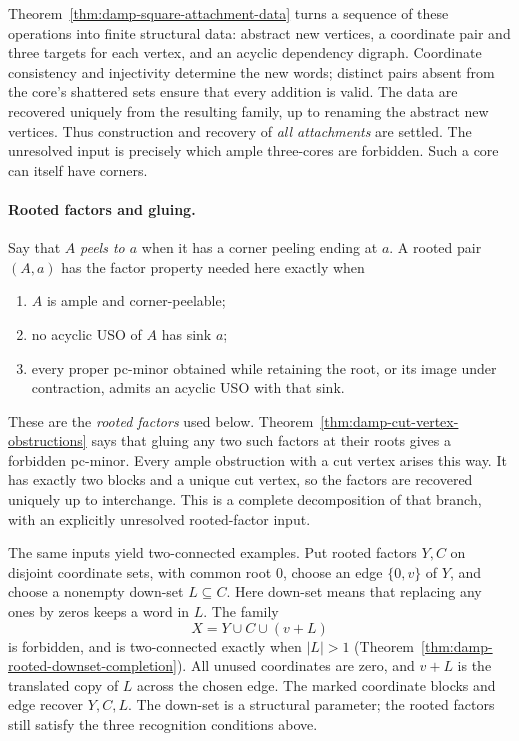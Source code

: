 \documentclass[11pt]{article}
\numberwithin{equation}{section}
\theoremstyle{definition}
\theoremstyle{remark}
\begin{document}
Theorem~\ref{thm:damp-square-attachment-data} turns a sequence of
these operations into finite structural data: abstract new vertices,
a coordinate pair and three targets for each vertex, and an acyclic
dependency digraph.  Coordinate consistency and injectivity determine
the new words; distinct pairs absent from the core's shattered sets
ensure that every addition is valid.  The data are recovered uniquely
from the resulting family, up to renaming the abstract new vertices.
Thus construction and recovery of \emph{all attachments} are settled.
The unresolved input is precisely which ample three-cores are forbidden.
Such a core can itself have corners.

\paragraph{Rooted factors and gluing.}
Say that \(A\) \emph{peels to \(a\)} when it has a corner peeling
ending at \(a\).  A rooted pair \((A,a)\) has the factor property
needed here exactly when
\begin{enumerate}
 \item \(A\) is ample and corner-peelable;
 \item no acyclic USO of \(A\) has sink \(a\);
 \item every proper pc-minor obtained while retaining the root, or
       its image under contraction, admits an acyclic USO with that sink.
\end{enumerate}
These are the \emph{rooted factors} used below.
Theorem~\ref{thm:damp-cut-vertex-obstructions} says that gluing any
two such factors at their roots gives a forbidden pc-minor.  Every
ample obstruction with a cut vertex arises this way.  It has exactly
two blocks and a unique cut vertex, so the factors are recovered
uniquely up to interchange.  This is a complete decomposition of that
branch, with an explicitly unresolved rooted-factor input.

The same inputs yield two-connected examples.  Put rooted factors
\(Y,C\) on disjoint coordinate sets, with common root \(0\), choose
an edge \(\{0,v\}\) of \(Y\), and choose a nonempty down-set
\(L\subseteq C\).  Here down-set means that replacing any ones by
zeros keeps a word in \(L\).  The family
\begin{equation}
 X=Y\cup C\cup(v+L)
 \label{eq:damp-introduction-downset}
\end{equation}
is forbidden, and is two-connected exactly when \(|L|>1\)
(Theorem~\ref{thm:damp-rooted-downset-completion}).  All unused
coordinates are zero, and \(v+L\) is the translated copy of \(L\)
across the chosen edge.  The marked coordinate blocks and edge recover
\(Y,C,L\).  The down-set is a structural parameter; the rooted
factors still satisfy the three recognition conditions above.
\end{document}
